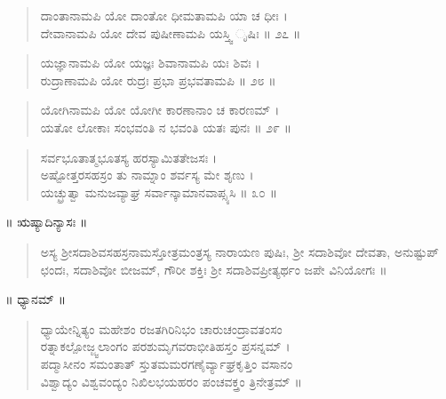 \begin{verse}
ದಾಂತಾನಾಮಪಿ ಯೋ ದಾಂತೋ ಧೀಮತಾಮಪಿ ಯಾ ಚ ಧೀಃ ।\\ದೇವಾನಾಮಪಿ ಯೋ ದೇವ ಪುಷೀಣಾಮಪಿ ಯಸ್ತ್ವಿ ೃಷಿಃ \num{॥ ೨೭ ॥}
\end{verse}

\begin{verse}
ಯಜ್ಞಾನಾಮಪಿ ಯೋ ಯಜ್ಞಃ ಶಿವಾನಾಮಪಿ ಯಃ ಶಿವಃ ।\\ರುದ್ರಾಣಾಮಪಿ ಯೋ ರುದ್ರಃ ಪ್ರಭಾ ಪ್ರಭವತಾಮಪಿ \num{॥ ೨೮ ॥}
\end{verse}

\begin{verse}
ಯೋಗಿನಾಮಪಿ ಯೋ ಯೋಗೀ ಕಾರಣಾನಾಂ ಚ ಕಾರಣಮ್ ।\\ಯತೋ ಲೋಕಾಃ ಸಂಭವಂತಿ ನ ಭವಂತಿ ಯತಃ ಪುನಃ \num{॥ ೨೯ ॥}
\end{verse}

\begin{verse}
ಸರ್ವಭೂತಾತ್ಮಭೂತಸ್ಯ ಹರಸ್ಯಾಮಿತತೇಜಸಃ ।\\ಅಷ್ಟೋತ್ತರಸಹಸ್ರಂ ತು ನಾಮ್ನಾಂ ಶರ್ವಸ್ಯ ಮೇ ಶೃಣು ।\\ಯಚ್ಛ್ರುತ್ವಾ ಮನುಜವ್ಯಾಘ್ರ ಸರ್ವಾನ್ಕಾಮಾನವಾಪ್ಸ್ಯಸಿ \num{॥ ೩೦ ॥}
\end{verse}

\begin{center}
॥ ಋಷ್ಯಾದಿನ್ಯಾಸಃ ॥
\end{center}

\begin{verse}
ಅಸ್ಯ ಶ್ರೀಸದಾಶಿವಸಹಸ್ರನಾಮಸ್ತೋತ್ರಮಂತ್ರಸ್ಯ ನಾರಾಯಣ ಪುಷಿಃ, ಶ್ರೀ ಸದಾಶಿವೋ ದೇವತಾ, ಅನುಷ್ಟುಪ್ ಛಂದಃ, ಸದಾಶಿವೋ ಬೀಜಮ್, ಗೌರೀ ಶಕ್ತಿಃ ಶ್ರೀ ಸದಾಶಿವಪ್ರೀತ್ಯರ್ಥಂ ಜಪೇ ವಿನಿಯೋಗಃ ॥
\end{verse}

\begin{center}
॥ ಧ್ಯಾನಮ್ ॥
\end{center}

\begin{verse}
ಧ್ಯಾಯೇನ್ನಿತ್ಯಂ ಮಹೇಶಂ ರಜತಗಿರಿನಿಭಂ ಚಾರುಚಂದ್ರಾವತಂಸಂ\\ರತ್ನಾಕಲ್ಪೋಜ್ಜ್ವಲಾಂಗಂ ಪರಶುಮೃಗವರಾಭೀತಿಹಸ್ತಂ ಪ್ರಸನ್ನಮ್ ।\\ಪದ್ಮಾಸೀನಂ ಸಮಂತಾತ್ ಸ್ತುತಮಮರಗಣೈರ್ವ್ಯಾಘ್ರಕೃತ್ತಿಂ ವಸಾನಂ\\ವಿಶ್ವಾದ್ಯಂ ವಿಶ್ವವಂದ್ಯಂ ನಿಖಿಲಭಯಹರಂ ಪಂಚವಕ್ತ್ರಂ ತ್ರಿನೇತ್ರಮ್ ॥
\end{verse}

